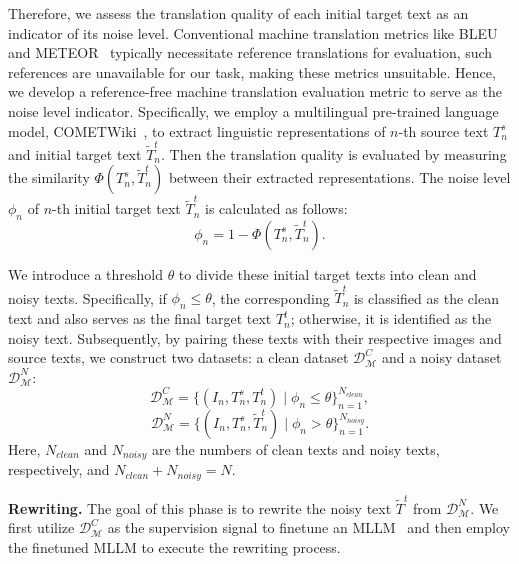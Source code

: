 \documentclass[10pt,journal,compsoc]{IEEEtran}
\begin{document}
Therefore, we assess the translation quality of each initial target text as an indicator of its noise level.
Conventional machine translation metrics like BLEU~\cite{papineni2002bleu} and METEOR~\cite{banerjee2005meteor} typically necessitate reference translations for evaluation, such references are unavailable for our task, making these metrics unsuitable. Hence, we develop a reference-free machine translation evaluation metric to serve as the noise level indicator. Specifically, we employ a multilingual pre-trained language model, COMETWiki~\cite{rei2022cometkiwi}, to extract linguistic representations of \(n\)-th source text \(T^s_n\) and initial target text \(\widetilde{T}^t_n\). Then the translation quality is evaluated by measuring the similarity $\Phi(T^s_n, \widetilde{T}^t_n)$ between their extracted representations.
The noise level $\phi_n$ of \(n\)-th initial target text \(\widetilde{T}^t_n\) is calculated as follows:
\begin{equation} \label{eq:1}
\phi_n = 1-\Phi(T^s_n, \widetilde{T}^t_n).
\end{equation}

We introduce a threshold \(\theta\) to divide these initial target texts into clean and noisy texts. Specifically, if \(\phi_n \leq \theta\), the corresponding \(\widetilde{T}^t_n\) is classified as the clean text and also serves as the final target text \(T^t_n\); otherwise, it is identified as the noisy text. Subsequently, by pairing these texts with their respective images and source texts, we construct two datasets: a clean dataset \(\mathcal{D}^C_{\mathcal{M}}\) and a noisy dataset \(\mathcal{D}^N_{\mathcal{M}}\):
\begin{equation}
\label{eq: 2}
\mathcal{D}^C_{\mathcal{M}} = \{(I_n, T^s_n, T^t_n) \mid \phi_n \leq \theta \}^{N_{clean}}_{n=1},
\end{equation}
\begin{equation}
\label{eq: 3}
\mathcal{D}^N_{\mathcal{M}} = \{(I_n, T^s_n, \widetilde{T}^t_n) \mid \phi_n > \theta \}^{N_{noisy}}_{n=1}.
\end{equation}
Here, \(N_{clean}\) and \(N_{noisy}\) are the numbers of clean texts and noisy texts, respectively, and \(N_{clean} + N_{noisy} = N\).

\textbf{Rewriting.}
The goal of this phase is to rewrite the noisy text \(\widetilde{T}^t\) from \(\mathcal{D}^N_{\mathcal{M}}\). 
We first utilize \(\mathcal{D}^C_{\mathcal{M}}\) as the supervision signal to finetune an MLLM~\cite{bai2023qwenvl, abdin2024phi} and then employ the finetuned MLLM to execute the rewriting process.
\end{document}
